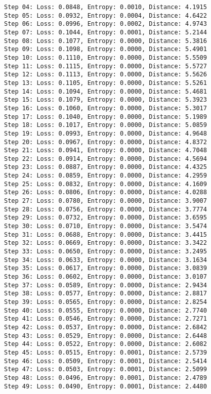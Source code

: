 \documentclass[11pt]{article}
\begin{document}
\begin{Verbatim}[commandchars=\\\{\}]
Step 04: Loss: 0.0848, Entropy: 0.0010, Distance: 4.1915
Step 05: Loss: 0.0932, Entropy: 0.0004, Distance: 4.6422
Step 06: Loss: 0.0996, Entropy: 0.0002, Distance: 4.9743
Step 07: Loss: 0.1044, Entropy: 0.0001, Distance: 5.2144
Step 08: Loss: 0.1077, Entropy: 0.0000, Distance: 5.3816
Step 09: Loss: 0.1098, Entropy: 0.0000, Distance: 5.4901
Step 10: Loss: 0.1110, Entropy: 0.0000, Distance: 5.5509
Step 11: Loss: 0.1115, Entropy: 0.0000, Distance: 5.5727
Step 12: Loss: 0.1113, Entropy: 0.0000, Distance: 5.5626
Step 13: Loss: 0.1105, Entropy: 0.0000, Distance: 5.5261
Step 14: Loss: 0.1094, Entropy: 0.0000, Distance: 5.4681
Step 15: Loss: 0.1079, Entropy: 0.0000, Distance: 5.3923
Step 16: Loss: 0.1060, Entropy: 0.0000, Distance: 5.3017
Step 17: Loss: 0.1040, Entropy: 0.0000, Distance: 5.1989
Step 18: Loss: 0.1017, Entropy: 0.0000, Distance: 5.0859
Step 19: Loss: 0.0993, Entropy: 0.0000, Distance: 4.9648
Step 20: Loss: 0.0967, Entropy: 0.0000, Distance: 4.8372
Step 21: Loss: 0.0941, Entropy: 0.0000, Distance: 4.7048
Step 22: Loss: 0.0914, Entropy: 0.0000, Distance: 4.5694
Step 23: Loss: 0.0887, Entropy: 0.0000, Distance: 4.4325
Step 24: Loss: 0.0859, Entropy: 0.0000, Distance: 4.2959
Step 25: Loss: 0.0832, Entropy: 0.0000, Distance: 4.1609
Step 26: Loss: 0.0806, Entropy: 0.0000, Distance: 4.0288
Step 27: Loss: 0.0780, Entropy: 0.0000, Distance: 3.9007
Step 28: Loss: 0.0756, Entropy: 0.0000, Distance: 3.7774
Step 29: Loss: 0.0732, Entropy: 0.0000, Distance: 3.6595
Step 30: Loss: 0.0710, Entropy: 0.0000, Distance: 3.5474
Step 31: Loss: 0.0688, Entropy: 0.0000, Distance: 3.4415
Step 32: Loss: 0.0669, Entropy: 0.0000, Distance: 3.3422
Step 33: Loss: 0.0650, Entropy: 0.0000, Distance: 3.2495
Step 34: Loss: 0.0633, Entropy: 0.0000, Distance: 3.1634
Step 35: Loss: 0.0617, Entropy: 0.0000, Distance: 3.0839
Step 36: Loss: 0.0602, Entropy: 0.0000, Distance: 3.0107
Step 37: Loss: 0.0589, Entropy: 0.0000, Distance: 2.9434
Step 38: Loss: 0.0577, Entropy: 0.0000, Distance: 2.8817
Step 39: Loss: 0.0565, Entropy: 0.0000, Distance: 2.8254
Step 40: Loss: 0.0555, Entropy: 0.0000, Distance: 2.7740
Step 41: Loss: 0.0546, Entropy: 0.0000, Distance: 2.7271
Step 42: Loss: 0.0537, Entropy: 0.0000, Distance: 2.6842
Step 43: Loss: 0.0529, Entropy: 0.0000, Distance: 2.6448
Step 44: Loss: 0.0522, Entropy: 0.0000, Distance: 2.6082
Step 45: Loss: 0.0515, Entropy: 0.0001, Distance: 2.5739
Step 46: Loss: 0.0509, Entropy: 0.0001, Distance: 2.5414
Step 47: Loss: 0.0503, Entropy: 0.0001, Distance: 2.5099
Step 48: Loss: 0.0496, Entropy: 0.0001, Distance: 2.4789
Step 49: Loss: 0.0490, Entropy: 0.0001, Distance: 2.4480

\end{Verbatim}
\end{document}
